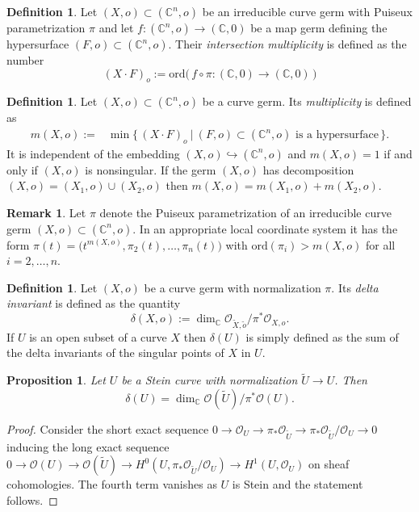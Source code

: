\documentclass[11pt]{amsart}
\newtheorem{prop}[theorem]{Proposition}
\theoremstyle{definition}
\newtheorem{definition}[theorem]{Definition}
\newtheorem{remark}[theorem]{Remark}
\newcommand{\bC}{{\mathbb C}}
\begin{document}
\begin{definition}\label{def:intmult}
    Let $(X,o) \subset (\bC^n,o)$ be an irreducible curve germ with Puiseux parametrization $\pi$ and let $f : (\bC^n,o) \to (\bC,0)$ be a map germ defining the hypersurface $(F,o) \subset (\bC^n,o)$. Their \emph{intersection multiplicity} is defined as the number
    $$(X\cdot F)_o := \text{ord}\big(\, f\circ \pi : (\bC,0) \to (\bC,0)\,\big)$$
\end{definition}

\begin{definition}
    Let $(X,o) \subset (\bC^n,o)$ be a curve germ. Its \emph{multiplicity} is defined as
    \begin{align*}
        m(X,o):=& \min \big\{\, (X\cdot F)_o \ \big| \ (F,o) \subset (\bC^n,o) \text{ is a hypersurface} \,\big\}.
    \end{align*}
    It is independent of the embedding $(X,o) \hookrightarrow (\bC^n,o)$ and $m(X,o) = 1$ if and only if $(X,o)$ is nonsingular. If the germ $(X,o)$ has decomposition $(X,o) = (X_1,o)\cup(X_2,o)$ then $m(X,o) = m(X_1,o)+m(X_2,o)$.
\end{definition}

\begin{remark}
    Let $\pi$ denote the Puiseux parametrization of an irreducible curve germ $(X,o) \subset (\bC^n,o)$. In an appropriate local coordinate system it has the form $\pi(t) = \big(t^{m(X,o)}, \pi_2(t),\dots,\pi_n(t)\big)$ with $\text{ord}(\pi_i) > m(X,o)$ for all $i=2,\dots, n$.
\end{remark}


\begin{definition}\label{def:delta}
    Let $(X,o)$ be a curve germ with normalization $\pi$. Its \emph{delta invariant} is defined as the quantity
    $$\delta(X,o) := \dim_\bC \mathcal{O}_{\widetilde{X},\tilde{o}}\big/\pi^*\mathcal{O}_{X,o}.$$
    If $U$ is an open subset of a curve $X$ then $\delta(U)$ is simply defined as the sum of the delta invariants of the singular points of $X$ in $U$.
\end{definition}

    \begin{prop}\label{prop:deltastein}
        Let $U$ be a Stein curve with normalization $\widetilde{U} \to U$. Then
        $$\delta(U) = \dim_\bC  \mathcal{O}(\widetilde{U}) \big/ \pi^*\mathcal{O}(U).$$
    \end{prop}

    \begin{proof}
        Consider the short exact sequence $0 \to \mathcal{O}_U \to \pi_*\mathcal{O}_{\widetilde{U}} \to \pi_*\mathcal{O}_{\widetilde{U}} / \mathcal{O}_U \to 0$ inducing the long exact sequence
    $0 \to \mathcal{O}(U) \to \mathcal{O}(\widetilde{U}) \to H^0(U,\pi_*\mathcal{O}_{\widetilde{U}}/\mathcal{O}_U ) \to H^1(U,\mathcal{O}_U)$
    on sheaf cohomologies. The fourth term vanishes as $U$ is Stein and the statement follows.
    \end{proof}
\end{document}

